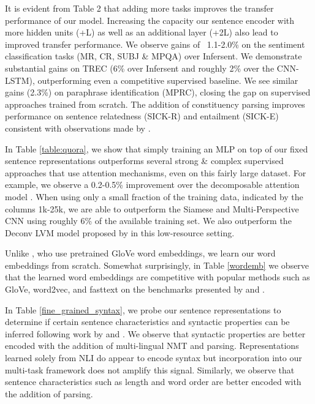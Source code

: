 \documentclass{article} \usepackage{iclr2018_conference,times}
\begin{document}
It is evident from Table 2 that adding more tasks improves the transfer performance of our model. Increasing the capacity our sentence encoder with more hidden units (+L) as well as an additional layer (+2L) also lead to improved transfer performance. We observe gains of ~1.1-2.0\% on the sentiment classification tasks (MR, CR, SUBJ \& MPQA) over Infersent. We demonstrate substantial gains on TREC (6\% over Infersent and roughly 2\% over the CNN-LSTM), outperforming even a competitive supervised baseline. We see similar gains (2.3\%) on paraphrase identification (MPRC), closing the gap on supervised approaches trained from scratch. The addition of constituency parsing improves performance on sentence relatedness (SICK-R) and entailment (SICK-E) consistent with observations made by \cite{bowman2016fast}.

In Table \ref{table:quora}, we show that simply training an MLP on top of our fixed sentence representations outperforms several strong \& complex supervised approaches that use attention mechanisms, even on this fairly large dataset. For example, we observe a 0.2-0.5\% improvement over the decomposable attention model \citep{parikh2016decomposable}. When using only a small fraction of the training data, indicated by the columns 1k-25k, we are able to outperform the Siamese and Multi-Perspective CNN using roughly 6\% of the available training set. We also outperform the Deconv LVM model proposed by \cite{shen2017deconvolutional} in this low-resource setting.

Unlike \cite{conneau2017supervised}, who use pretrained GloVe word embeddings, we learn our word embeddings from scratch. Somewhat surprisingly, in Table \ref{wordemb} we observe that the learned word embeddings are competitive with popular methods such as GloVe, word2vec, and fasttext \citep{bojanowski2016enriching} on the benchmarks presented by \cite{faruqui2014community} and \cite{tsvetkov2015evaluation}.

In Table \ref{fine_grained_syntax}, we probe our sentence representations to determine if certain sentence characteristics and syntactic properties can be inferred following work by \cite{adi2016fine} and \cite{shi2016does}. We observe that syntactic properties are better encoded with the addition of multi-lingual NMT and parsing. Representations learned solely from NLI do appear to encode syntax but incorporation into our multi-task framework does not amplify this signal. Similarly, we observe that sentence characteristics such as length and word order are better encoded with the addition of parsing.
\end{document}
